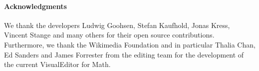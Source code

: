 \documentclass{llncs}
\begin{document}
\paragraph*{Acknowledgments} We thank the developers Ludwig Goohsen, Stefan Kaufhold, Jonas Kress, Vincent Stange and many others for their open source contributions.
 Furthermore, we thank the Wikimedia Foundation and in particular Thalia Chan, Ed Sanders and James Forrester from the editing team for the development of the current VisualEditor for Math.
\printbibliography[keyword=primary]
\end{document}
